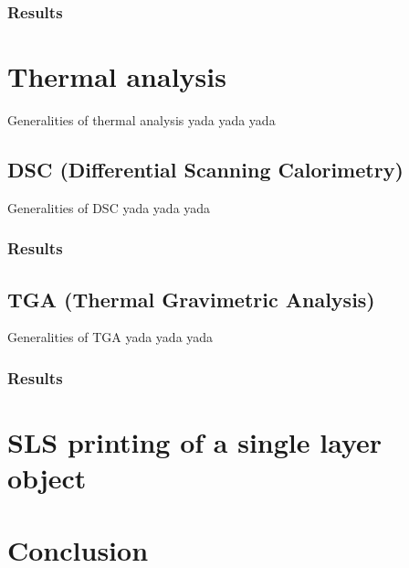 \documentclass{article}
\begin{document}
            \subsubsection{Results}

    \clearpage
    \section{Thermal analysis\label{Thermal_analysis}}
    Generalities of thermal analysis yada yada yada
        \subsection{DSC (Differential Scanning Calorimetry)\label{DSC_analysis}}
        Generalities of DSC yada yada yada 
            \subsubsection{Results}
        \subsection{TGA (Thermal Gravimetric Analysis)\label{TGA_Analysis}}
        Generalities of TGA yada yada yada 
            \subsubsection{Results}

    \clearpage
    \section{SLS printing of a single layer object}

    \clearpage
    \section{Conclusion}

    

    
    
    











    \clearpage

    \printbibliography
\end{document}
